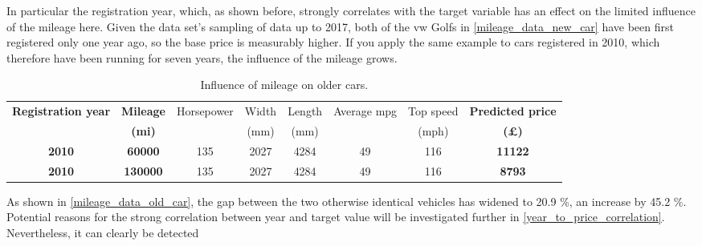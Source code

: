 In particular the registration year, which, as shown before, strongly correlates with the target variable has an effect on the limited
influence of the mileage here.
Given the data set's sampling of data up to 2017, both of the \ac{vw} Golfs in \autoref{mileage_data_new_car} have been first registered only one year ago, so the base price is measurably higher.
If you apply the same example to cars registered in 2010, which therefore have been running for seven years, the influence of the mileage grows.
\begin{table}[H]
    \begin{adjustbox}{width={\textwidth}}
        \begin{tabular}{|c|c|c|c|c|c|c|c|}
            \hline
            \textbf{Registration year} & \textbf{Mileage} & Horsepower & Width & Length & Average mpg & Top speed & \textbf{Predicted price} \\
                                       & \textbf{(mi)}    &            & (mm)  & (mm)   &             & (mph)     & \textbf{(£)}             \\ \hline
            \textbf{2010}              & \textbf{60000}   & 135        & 2027  & 4284   & 49          & 116       & \textbf{11122}           \\\hline
            \textbf{2010}              & \textbf{130000}  & 135        & 2027  & 4284   & 49          & 116       & \textbf{8793}            \\\hline
        \end{tabular}
    \end{adjustbox}
    \caption{Influence of mileage on older cars.}
    \label{mileage_data_old_car}
\end{table}
As shown in \autoref{mileage_data_old_car}, the gap between the two otherwise identical vehicles has widened to 20.9 \%, an increase by 45.2 \%.
Potential reasons for the strong correlation between year and target value will be investigated further in \autoref{year_to_price_correlation}.
Nevertheless, it can clearly be detected
